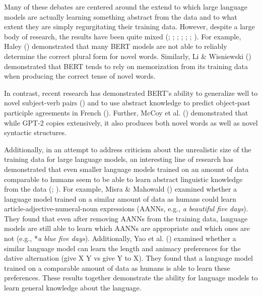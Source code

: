 \documentclass[
  12pt,
  letterpaper,
]{scrreprt}
\begin{document}
Many of these debates are centered around the extend to which large
language models are actually learning something abstract from the data
and to what extent they are simply regurgitating their training data.
However, despite a large body of research, the results have been quite
mixed (;
;
;
;
;
;
). For
example, Haley () demonstrated
that many BERT models are not able to reliably determine the correct
plural form for novel words. Similarly, Li \& Wisniewski
() demonstrated that BERT
tends to rely on memorization from its training data when producing the
correct tense of novel words.

In contrast, recent research has demonstrated BERT's ability to
generalize well to novel subject-verb pairs
() and
to use abstract knowledge to predict object-past participle agreements
in French (). Further, McCoy et al.
() demonstrated that while
GPT-2 copies extensively, it also produces both novel words as well as
novel syntactic structures.

Additionally, in an attempt to address criticism about the unrealistic
size of the training data for large language models, an interesting line
of research has demonstrated that even smaller language models trained
on an amount of data comparable to humans seem to be able to learn
abstract linguistic knowledge from the data
(;
). For
example, Misra \& Mahowald
() examined whether a
language model trained on a similar amount of data as humans could learn
article-adjective-numeral-noun expressions (AANNs, e.g., \emph{a
beautiful five days}). They found that even after removing AANNs from
the training data, language models are still able to learn which AANNs
are appropriate and which ones are not (e.g., *\emph{a blue five days}).
Additionally, Yao et al.
() examined whether a
similar language model can learn the length and animacy preferences for
the dative alternation (give X Y vs give Y to X). They found that a
language model trained on a comparable amount of data as humans is able
to learn these preferences. These results together demonstrate the
ability for language models to learn general knowledge about the
language.
\end{document}
